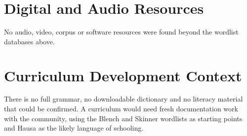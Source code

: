 \documentclass[12pt]{article}
\begin{document}
\section{Digital and Audio Resources}
No audio, video, corpus or software resources were found beyond the wordlist databases above.

\section{Curriculum Development Context}
There is no full grammar, no downloadable dictionary and no literacy material that could be confirmed. A curriculum would need fresh documentation work with the community, using the Blench and Skinner wordlists as starting points and Hausa as the likely language of schooling.
\end{document}
